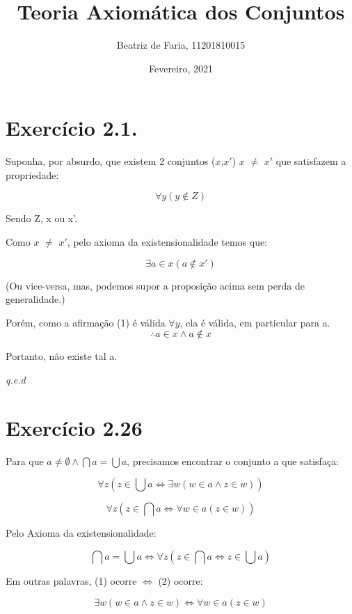 \documentclass[12pt]{extarticle}
\title{Teoria Axiomática dos Conjuntos}
\author{Beatriz de Faria, 11201810015}
\date{Fevereiro, 2021}
\newcommand{\fim}{\begin{flushright}

   \emph{q.e.d}
\end{flushright}}
\begin{document}
\maketitle

\section{Exercício 2.1.}

Suponha, por absurdo, que existem 2 conjuntos ($x$,$x'$) $x$ $\neq$ $x'$ que satisfazem a propriedade:

\begin{equation}
   \forall y (y \notin Z)
\end{equation}

Sendo Z, x ou x'.

Como $x$ $\neq$ $x'$, pelo axioma da existensionalidade temos que:

$$\exists a \in x (a \notin x')$$

(Ou vice-versa, mas, podemos supor a proposição acima sem perda de generalidade.)

Porém, como a afirmação (1) é válida $\forall y$, ela é válida, em particular para a.
$$\therefore a \in x \land a \notin x$$

Portanto, não existe tal a.

\fim

\section{Exercício 2.26}

Para que $a \neq \emptyset \land \bigcap a = \bigcup a$, precisamos encontrar o conjunto a que satisfaça:

\begin{equation}
    \forall z (z \in \bigcup a \Leftrightarrow \exists w (w \in a \land z \in w))
\end{equation}

\begin{equation}
    \forall z (z \in \bigcap a \Leftrightarrow \forall w \in a (z \in w))
\end{equation}

Pelo Axioma da existensionalidade:

$$
\bigcap a = \bigcup a \Leftrightarrow \forall z (z \in \bigcap a \Leftrightarrow z \in \bigcup a)
$$

Em outras palavras, (1) ocorre $\Leftrightarrow$ (2) ocorre:

$$
\exists w (w \in a \land z \in w) \Leftrightarrow \forall w \in a (z \in w)
$$
\end{document}
